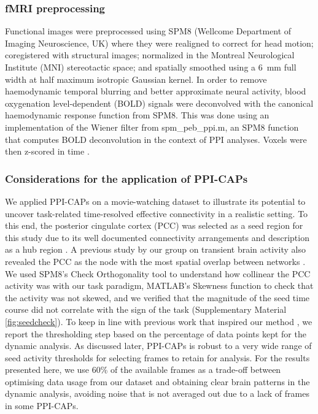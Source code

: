 \subsubsection{fMRI preprocessing}
Functional images were preprocessed using SPM8 (Wellcome Department of Imaging Neuroscience, UK) where they were realigned to correct for head motion; coregistered with structural images; normalized  in the Montreal Neurological Institute (MNI) stereotactic space; and spatially smoothed using a 6~mm full width at half maximum isotropic Gaussian kernel. In order to remove haemodynamic temporal blurring and better approximate neural activity, blood oxygenation level-dependent (BOLD) signals were deconvolved with the canonical haemodynamic response function from SPM8. This was done using an implementation of the Wiener filter from spm\_peb\_ppi.m, an SPM8 function that computes BOLD deconvolution in the context of PPI analyses. Voxels were then z-scored in time \citep{Liu2013}.


\subsubsection{Considerations for the application of PPI-CAPs}
We applied PPI-CAPs on a movie-watching dataset to illustrate its potential to uncover task-related time-resolved effective connectivity in a realistic setting. To this end, the posterior cingulate cortex (PCC) was selected as a seed region for this study due to its well documented connectivity arrangements \citep{Lin2017} and description as a hub region \citep{Andrews-hanna2010}. A previous study by our group on transient brain activity also revealed the PCC as the node with the most spatial overlap between networks \citep{Karahanoglu2015a}. We used SPM8's Check Orthogonality tool to understand how collinear the PCC activity was with our task paradigm, MATLAB's Skewness function to check that the activity was not skewed, and we verified that the magnitude of the seed time course did not correlate with the sign of the task (Supplementary Material \ref{fig:seedcheck}). To keep in line with previous work that inspired our method \citep{Liu2013}, we report the thresholding step based on the percentage of data points kept for the dynamic analysis. As discussed later, PPI-CAPs is robust to a very wide range of seed activity thresholds for selecting frames to retain for analysis. For the results presented here, we use 60\% of the available frames as a trade-off between optimising data usage from our dataset and obtaining clear brain patterns in the dynamic analysis, avoiding noise that is not averaged out due to a lack of frames in some PPI-CAPs.



